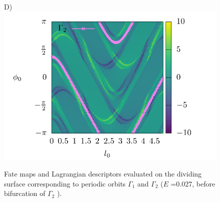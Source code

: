 \documentclass[10pt,aps,onecolumn,superscriptaddress]{revtex4-2}
\begin{document}
\begin{figure}[htbp]
	D)\includegraphics[scale=0.35]{ld_action_ds_gamma2_E_0027.png}
	\caption{ Fate maps and Lagrangian descriptors evaluated on the dividing surface corresponding to periodic orbits $\Gamma_1$ and $\Gamma_2$ ($E$ =0.027, before bifurcation of $\Gamma_2$  ). }
	\label{fig:ld_fm_ds}
\end{figure}
\end{document}
